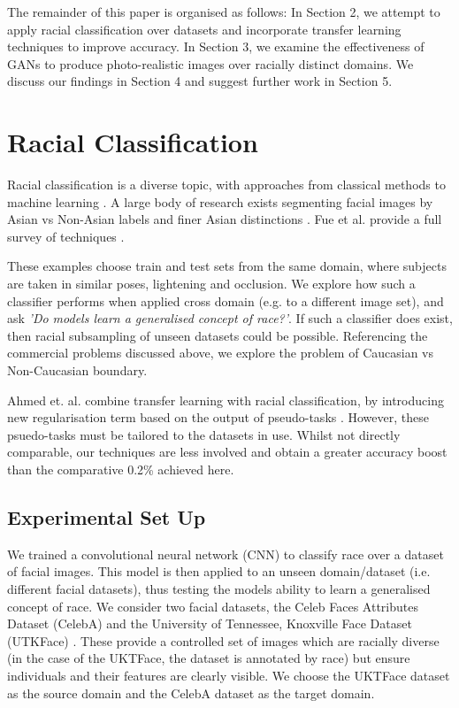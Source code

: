 \documentclass[10pt,twocolumn,letterpaper]{article}
\begin{document}
The remainder of this paper is organised as follows: In Section 2, we attempt to apply racial classification over datasets and incorporate transfer learning techniques to improve accuracy. In Section 3, we examine the effectiveness of GANs to produce photo-realistic images over racially distinct domains. We discuss our findings in Section 4 and suggest further work in Section 5.

\section{Racial Classification}

Racial classification is a diverse topic, with approaches from classical methods to machine learning \cite{jain201650}. A large body of research exists segmenting facial images by Asian vs Non-Asian labels \cite{lyle2010soft,zarei2012artificial,qiu2006global} and finer Asian distinctions \cite{Wang:2016aa}. Fue et al. provide a full survey of techniques \cite{fu2014learning}. 

These examples choose train and test sets from the same domain, where subjects are taken in similar poses, lightening and occlusion. We explore how such a classifier performs when applied cross domain (e.g. to a different image set), and ask \textit{'Do models learn a generalised concept of race?'}. If such a classifier does exist, then racial subsampling of unseen datasets could be possible. Referencing the commercial problems discussed above, we explore the problem of Caucasian vs Non-Caucasian boundary.

Ahmed et. al. combine transfer learning with racial classification, by introducing new regularisation term based on the output of pseudo-tasks \cite{ahmed2008training}. However, these psuedo-tasks must be tailored to the datasets in use. Whilst not directly comparable, our techniques are less involved and obtain a greater accuracy boost than the comparative 0.2\% achieved here. 

\subsection{Experimental Set Up}

We trained a convolutional neural network (CNN) to classify race over a dataset of facial images. This model is then applied to an unseen domain/dataset (i.e. different facial datasets), thus testing the models ability to learn a generalised concept of race. We consider two facial datasets, the Celeb Faces Attributes Dataset (CelebA) \cite{liu2015faceattributes} and the University of Tennessee, Knoxville Face Dataset (UTKFace) \cite{zhifei2017cvpr}. These provide a controlled set of images which are racially diverse (in the case of the UKTFace, the dataset is annotated by race) but ensure individuals and their features are clearly visible. We choose the UKTFace dataset as the source domain and the CelebA dataset as the target domain.
\end{document}
